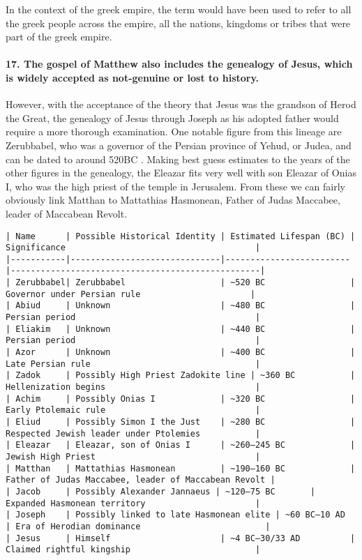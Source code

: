 In the context of the greek empire, the term would have been used to refer to all the greek people across the empire, all the nations, kingdoms or tribes that were part of the greek empire.

\paragraph{17.
The gospel of Matthew also includes the genealogy of Jesus, which is widely accepted as not-genuine or lost to history.}\label{par:the-gospel-of-matthew-also-includes-the-genealogy-of-jesus-which-is-widely-accepted-as-not-genuine-or-lost-to-history.}

However, with the acceptance of the theory that Jesus was the grandson of Herod the Great, the genealogy of Jesus through Joseph as his adopted father would require a more thorough examination.
One notable figure from this lineage are Zerubbabel, who was a governor of the Persian province of Yehud, or Judea, and can be dated to around 520BC .
Making best guess estimates to the years of the other figures in the genealogy, the Eleazar fits very well with son Eleazar of Onias I, who was the high priest of the temple in Jerusalem.
From these we can fairly obviously link Matthan to Mattathias Hasmonean, Father of Judas Maccabee, leader of Maccabean Revolt.

\begin{verbatim}
| Name      | Possible Historical Identity | Estimated Lifespan (BC) | Significance                                      |
|-----------|------------------------------|-------------------------|--------------------------------------------------|
| Zerubbabel| Zerubbabel                   | ~520 BC                 | Governor under Persian rule                      |
| Abiud     | Unknown                      | ~480 BC                 | Persian period                                    |
| Eliakim   | Unknown                      | ~440 BC                 | Persian period                                    |
| Azor      | Unknown                      | ~400 BC                 | Late Persian rule                                 |
| Zadok     | Possibly High Priest Zadokite line | ~360 BC           | Hellenization begins                              |
| Achim     | Possibly Onias I             | ~320 BC                 | Early Ptolemaic rule                              |
| Eliud     | Possibly Simon I the Just    | ~280 BC                 | Respected Jewish leader under Ptolemies           |
| Eleazar   | Eleazar, son of Onias I      | ~260–245 BC             | Jewish High Priest                                |
| Matthan   | Mattathias Hasmonean         | ~190–160 BC             | Father of Judas Maccabee, leader of Maccabean Revolt |
| Jacob     | Possibly Alexander Jannaeus | ~120–75 BC       | Expanded Hasmonean territory                      |
| Joseph    | Possibly linked to late Hasmonean elite | ~60 BC–10 AD  | Era of Herodian dominance                         |
| Jesus     | Himself                      | ~4 BC–30/33 AD          | Claimed rightful kingship                         |
\end{verbatim}

